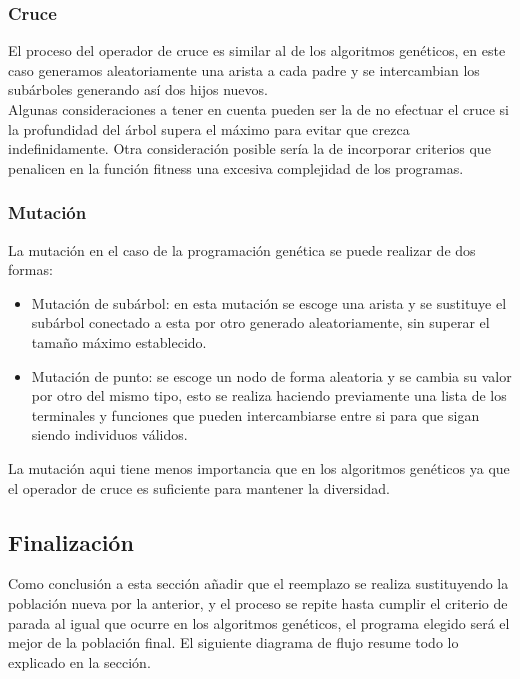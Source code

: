 \documentclass[12pt]{article} \usepackage[utf8x]{inputenc}
\begin{document}
 \subsubsection{Cruce}
 
 El proceso del operador de cruce es similar al de los algoritmos genéticos, en este caso generamos aleatoriamente una arista a cada padre y se intercambian los subárboles generando así dos hijos nuevos.\\
 Algunas consideraciones a tener en cuenta pueden ser la de no efectuar el cruce si la profundidad del árbol supera el máximo para evitar que crezca indefinidamente. Otra consideración posible sería la de incorporar criterios que penalicen en la función fitness una excesiva complejidad de los programas.
 
 \subsubsection{Mutación}
 
 La mutación en el caso de la programación genética se puede realizar de dos formas:
 
 \begin{itemize}
\item  Mutación de subárbol: en esta mutación se escoge una arista y se sustituye el subárbol conectado a esta por otro generado aleatoriamente, sin superar el tamaño máximo establecido.
\item  Mutación de punto: se escoge un nodo de forma aleatoria y se cambia su valor por otro del mismo tipo, esto se realiza haciendo previamente una lista de los terminales y funciones que pueden intercambiarse entre si para que sigan siendo individuos válidos.
\end{itemize}

La mutación aqui tiene menos importancia que en los algoritmos genéticos ya que el operador de cruce es suficiente para mantener la diversidad.

\subsection{Finalización}

Como conclusión a esta sección añadir que el reemplazo se realiza sustituyendo la población nueva por la anterior, y el proceso se repite hasta cumplir el criterio de parada al igual que ocurre en los algoritmos genéticos, el programa elegido será el mejor de la población final. El siguiente diagrama de flujo resume todo lo explicado en la sección.
  
\end{document}
